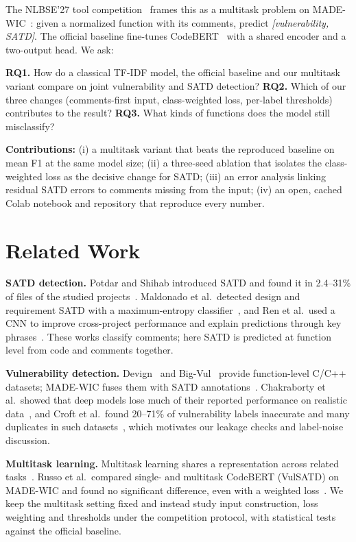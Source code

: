 \documentclass[conference]{IEEEtran}
\begin{document}
The NLBSE'27 tool competition~\cite{nlbse27} frames this as a multitask problem on MADE-WIC~\cite{madewic}: given a normalized function with its comments, predict \emph{[vulnerability, SATD]}. The official baseline fine-tunes CodeBERT~\cite{codebert} with a shared encoder and a two-output head. We ask:

\textbf{RQ1.} How do a classical TF-IDF model, the official baseline and our multitask variant compare on joint vulnerability and SATD detection?
\textbf{RQ2.} Which of our three changes (comments-first input, class-weighted loss, per-label thresholds) contributes to the result?
\textbf{RQ3.} What kinds of functions does the model still misclassify?

\textbf{Contributions:} (i) a multitask variant that beats the reproduced baseline on mean F1 at the same model size; (ii) a three-seed ablation that isolates the class-weighted loss as the decisive change for SATD; (iii) an error analysis linking residual SATD errors to comments missing from the input; (iv) an open, cached Colab notebook and repository that reproduce every number.

\section{Related Work}
\textbf{SATD detection.} Potdar and Shihab introduced SATD and found it in 2.4--31\% of files of the studied projects~\cite{potdar2014}. Maldonado et al.\ detected design and requirement SATD with a maximum-entropy classifier~\cite{maldonado2017}, and Ren et al.\ used a CNN to improve cross-project performance and explain predictions through key phrases~\cite{ren2019}. These works classify comments; here SATD is predicted at function level from code and comments together.

\textbf{Vulnerability detection.} Devign~\cite{devign} and Big-Vul~\cite{bigvul} provide function-level C/C++ datasets; MADE-WIC fuses them with SATD annotations~\cite{madewic}. Chakraborty et al.\ showed that deep models lose much of their reported performance on realistic data~\cite{chakraborty2022}, and Croft et al.\ found 20--71\% of vulnerability labels inaccurate and many duplicates in such datasets~\cite{croft2023}, which motivates our leakage checks and label-noise discussion.

\textbf{Multitask learning.} Multitask learning shares a representation across related tasks~\cite{caruana1997}. Russo et al.\ compared single- and multitask CodeBERT (VulSATD) on MADE-WIC and found no significant difference, even with a weighted loss~\cite{russo2025}. We keep the multitask setting fixed and instead study input construction, loss weighting and thresholds under the competition protocol, with statistical tests against the official baseline.
\end{document}
